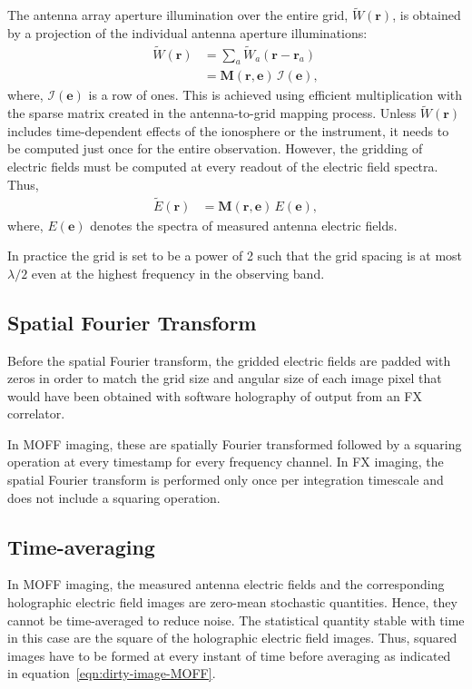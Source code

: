 \documentclass[a4paper,fleqn,usenatbib]{../mnras}
\begin{document}
The antenna array aperture illumination over the entire grid, $\widetilde{W}(\mathbf{r})$, is obtained by a projection of the individual antenna aperture illuminations:
\begin{align}
  \widetilde{W}(\mathbf{r}) &= \sum_a \widetilde{W}_a(\mathbf{r}-\mathbf{r}_a) \\
                            &= \mathbf{M}(\mathbf{r},\mathbf{e})\,\mathcal{I}(\mathbf{e}),
\end{align}
where, $\mathcal{I}(\mathbf{e})$ is a row of ones. This is achieved using efficient multiplication with the sparse matrix created in the antenna-to-grid mapping process. Unless $\widetilde{W}(\mathbf{r})$ includes time-dependent effects of the ionosphere or the instrument, it needs to be computed just once for the entire observation. However, the gridding of electric fields must be computed at every readout of the electric field spectra. Thus,
\begin{align}
  \widetilde{E}(\mathbf{r}) &= \mathbf{M}(\mathbf{r},\mathbf{e})\,E(\mathbf{e}),
\end{align}
where, $E(\mathbf{e})$ denotes the spectra of measured antenna electric fields.

In practice the grid is set to be a power of 2 such that the grid spacing is at most $\lambda/2$ even at the highest frequency in the observing band. 

\subsection{Spatial Fourier Transform}

Before the spatial Fourier transform, the gridded electric fields are padded with zeros in order to match the grid size and angular size of each image pixel that would have been obtained with software holography of output from an FX correlator. 

In MOFF imaging, these are spatially Fourier transformed followed by a squaring operation at every timestamp for every frequency channel. In FX imaging, the spatial Fourier transform is performed only once per integration timescale and does not include a squaring operation.

\subsection{Time-averaging}

In MOFF imaging, the measured antenna electric fields and the corresponding holographic electric field images are zero-mean stochastic quantities. Hence, they cannot be time-averaged to reduce noise. The statistical quantity stable with time in this case are the square of the holographic electric field images. Thus, squared images have to be formed at every instant of time before averaging as indicated in equation~\ref{eqn:dirty-image-MOFF}.
\end{document}
